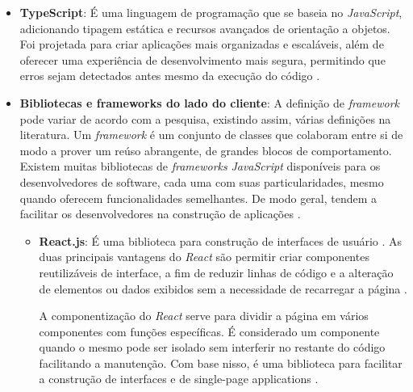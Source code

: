 \begin{itemize}
    \item \textbf{TypeScript}: É uma linguagem de programação que se baseia no \textit{JavaScript}, adicionando tipagem estática e recursos avançados de orientação a objetos. Foi projetada para criar aplicações mais organizadas e escaláveis, além de oferecer uma experiência de desenvolvimento mais segura, permitindo que erros sejam detectados antes mesmo da execução do código \cite{microsoft2025}.
    \item \textbf{Bibliotecas e frameworks do lado do cliente}: A definição de \textit{framework} pode variar de acordo com a pesquisa, existindo assim, várias definições na literatura. Um \textit{framework} é um conjunto de classes que colaboram entre si de modo a prover um reúso abrangente, de grandes blocos de comportamento. Existem muitas bibliotecas de \textit{frameworks} \textit{JavaScript} disponíveis para os desenvolvedores de software, cada uma com suas particularidades, mesmo quando oferecem funcionalidades semelhantes. De modo geral, tendem a facilitar os desenvolvedores na construção de aplicações \cite{silva2022comparaccao}.
    \begin{itemize}
        \item \textbf{React.js}: É uma biblioteca para construção de interfaces de usuário \cite{react2025}. As duas principais vantagens do \textit{React} são permitir criar componentes reutilizáveis de interface, a fim de reduzir linhas de código e a alteração de elementos ou dados exibidos sem a necessidade de recarregar a página \cite{LorenaUFOP2021}.
        
        A componentização do \textit{React} serve para dividir a página em vários componentes com funções específicas. É considerado um componente quando o mesmo pode ser isolado sem interferir no restante do código facilitando a manutenção. Com base nisso, é uma biblioteca para facilitar a construção de interfaces e de single-page applications \cite{LorenaUFOP2021}.
        

\end{itemize}
\end{itemize}
